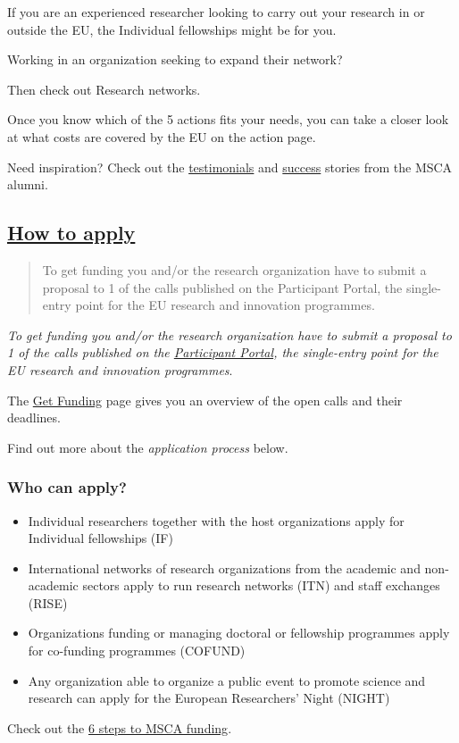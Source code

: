 \documentclass[oneside]{book}
\numberwithin{equation}{section}
\begin{document}
%
If you are an experienced researcher looking to carry out your research in or outside the EU, the Individual fellowships might be for you.

Working in an organization seeking to expand their network?

Then check out Research networks.

Once you know which of the 5 actions fits your needs, you can take a closer look at what costs are covered by the EU on the action page.

%
Need inspiration? Check out the \href{https://ec.europa.eu/research/mariecurieactions/resources/testimonials_en}{testimonials} and \href{https://ec.europa.eu/research/mariecurieactions/resources/success-stories_en}{success} stories from the MSCA alumni.

\subsection{\href{https://ec.europa.eu/research/mariecurieactions/how-to/apply_en}{How to apply}}
\begin{quotation}
    To get funding you and/or the research organization have to submit a proposal to 1 of the calls published on the Participant Portal, the single-entry point for the EU research and innovation programmes.
\end{quotation}
\textit{To get funding you and/or the research organization have to submit a proposal to 1 of the calls published on the \href{http://ec.europa.eu/research/participants/portal/desktop/en/home.html}{Participant Portal}, the single-entry point for the EU research and innovation programmes}.

%
The \href{https://ec.europa.eu/research/mariecurieactions/actions/get-funding_en}{Get Funding} page gives you an overview of the open calls and their deadlines.

Find out more about the \textit{application process} below.

\subsubsection{Who can apply?}
\begin{itemize}
    \item Individual researchers together with the host organizations apply for Individual fellowships (IF)
    \item International networks of research organizations from the academic and non-academic sectors apply to run research networks (ITN) and staff exchanges (RISE)
    \item Organizations funding or managing doctoral or fellowship programmes apply for co-funding  programmes (COFUND)
    \item Any organization able  to organize a public event to promote science and research can apply for the European Researchers' Night (NIGHT)
\end{itemize}
Check out the \href{https://ec.europa.eu/research/mariecurieactions/sites/mariecurie2/files/dgeac-msca-infographic-how-to-apply_en.pdf}{6 steps to MSCA funding}.
\end{document}
